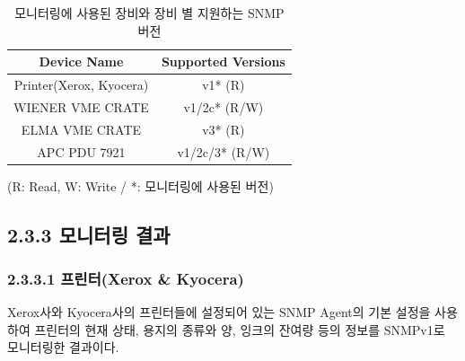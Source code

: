 \documentclass[11pt
  , a4paper
  , article
  , oneside
]{memoir}
\begin{document}
\begin{table}[h]
\begin{center}
\begin{tabular}{c|c}\hline
Device Name & Supported Versions \\ \hline
Printer(Xerox, Kyocera) & v1* (R) \\ \hline
WIENER VME CRATE & v1/2c* (R/W) \\ \hline
ELMA VME CRATE & v3* (R) \\ \hline
APC PDU 7921 & v1/2c/3* (R/W) \\ \hline
\end{tabular}
\caption{모니터링에 사용된 장비와 장비 별 지원하는 SNMP 버전}
{(R: Read, W: Write / *: 모니터링에 사용된 버전)}
  \label{table:used_version}  
\end{center}
\end{table} 

\clearpage
\subsection{2.3.3 모니터링 결과}
\subsubsection{2.3.3.1 프린터(Xerox \& Kyocera)}

Xerox사와 Kyocera사의 프린터들에 설정되어 있는 SNMP Agent의 기본 설정을 사용하여 프린터의 현재 상태, 용지의 종류와 양, 잉크의 잔여량 등의 정보를 SNMPv1로 모니터링한 결과이다. 
\end{document}
